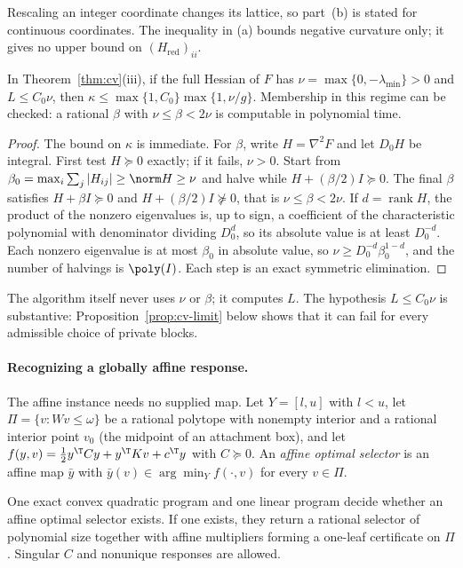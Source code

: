 Rescaling an integer coordinate changes its lattice, so part~(b) is stated for
continuous coordinates. The inequality in (a) bounds negative curvature only;
it gives no upper bound on $(H_{\mathrm{red}})_{ii}$.

\begin{corollary}\label{cor:cv-nu}
In Theorem~\ref{thm:cv}(iii), if the full Hessian of $F$ has
$\nu=\max\{0,-\lambda_{\min}\}>0$ and $L\le C_0\nu$, then
$\kappa\le\max\{1,C_0\}\max\{1,\nu/g\}$. Membership in this regime can be
checked: a rational $\beta$ with $\nu\le\beta<2\nu$ is computable in polynomial
time.
\end{corollary}

\begin{proof}
The bound on $\kappa$ is immediate. For $\beta$, write $H=\nabla^2F$ and let
$D_0H$ be integral. First test $H\succeq0$ exactly; if it fails, $\nu>0$.
Start from $\beta_0=\max_i\sum_j|H_{ij}|\ge\norm H\ge\nu$ and halve while
$H+(\beta/2)I\succeq0$. The final $\beta$ satisfies $H+\beta I\succeq0$ and
$H+(\beta/2)I\not\succeq0$, that is $\nu\le\beta<2\nu$. If $d=\operatorname{rank}H$,
the product of the nonzero eigenvalues is, up to sign, a coefficient of the
characteristic polynomial with denominator dividing $D_0^d$, so its absolute
value is at least $D_0^{-d}$. Each nonzero eigenvalue is at most $\beta_0$ in
absolute value, so $\nu\ge D_0^{-d}\beta_0^{1-d}$, and the number of halvings
is $\poly(I)$. Each step is an exact symmetric elimination.
\end{proof}

The algorithm itself never uses $\nu$ or $\beta$; it computes $L$. The
hypothesis $L\le C_0\nu$ is substantive: Proposition~\ref{prop:cv-limit} below
shows that it can fail for every admissible choice of private blocks.

\paragraph{Recognizing a globally affine response.}

The affine instance needs no supplied map. Let $Y=[l,u]$ with $l<u$, let
$\Pi=\{v:Wv\le\omega\}$ be a rational polytope with nonempty interior and a
rational interior point $v_0$ (the midpoint of an attachment box), and let
$f(y,v)=\frac12y^{\T}Cy+y^{\T}Kv+c^{\T}y$ with $C\succeq0$.
An \emph{affine optimal selector} is an affine map $\bar y$ with
$\bar y(v)\in\arg\min_{Y}f(\cdot,v)$ for every $v\in\Pi$.

\begin{theorem}\label{thm:cv-recog}
One exact convex quadratic program and one linear program decide whether an
affine optimal selector exists. If one exists, they return a rational selector
of polynomial size together with affine multipliers forming a one-leaf
certificate on $\Pi$. Singular $C$ and nonunique responses are allowed.
\end{theorem}

